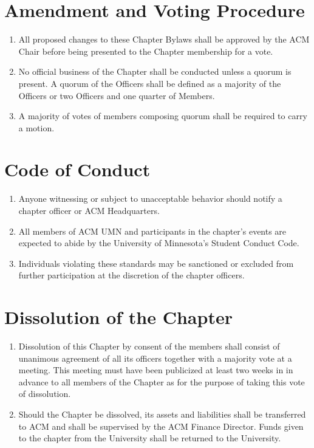 \section{Amendment and Voting Procedure}
\begin{enumerate}
	\item All proposed changes to these Chapter Bylaws shall be approved by the ACM Chair before being presented to the Chapter membership for a vote.
	\item No official business of the Chapter shall be conducted unless a quorum is present. A quorum of the Officers shall be defined as a majority of the Officers or two Officers and one quarter of Members.
	\item A majority of votes of members composing quorum shall be required to carry a motion.
\end{enumerate}

\section{Code of Conduct}
\begin{enumerate}
	\item Anyone witnessing or subject to unacceptable behavior should notify a chapter officer or ACM Headquarters.
	\item All members of ACM UMN and participants in the chapter’s events are expected to abide by the University of Minnesota’s Student Conduct Code.
	\item Individuals violating these standards may be sanctioned or excluded from further participation at the discretion of the chapter officers.
\end{enumerate}

\section{Dissolution of the Chapter}
\begin{enumerate}
	\item Dissolution of this Chapter by consent of the members shall consist of unanimous agreement of all its officers together with a majority vote at a meeting. This meeting must have been publicized at least two weeks in in advance to all members of the Chapter as for the purpose of taking this vote of dissolution.
	\item Should the Chapter be dissolved, its assets and liabilities shall be transferred to ACM and shall be supervised by the ACM Finance Director.  Funds given to the chapter from the University shall be returned to the University.
\end{enumerate}



